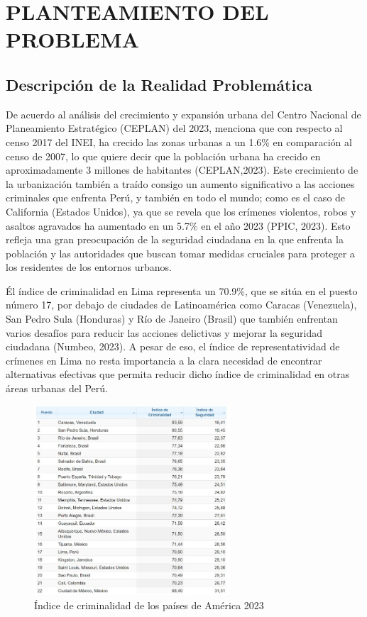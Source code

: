 \chapter{PLANTEAMIENTO DEL PROBLEMA}
\section{Descripción de la Realidad Problemática}

De acuerdo al análisis del crecimiento y expansión urbana del Centro Nacional de Planeamiento Estratégico (CEPLAN) del 2023, menciona que con respecto al censo 2017 del INEI, ha crecido las zonas urbanas a un 1.6\% en comparación al censo de 2007, lo que quiere decir que la población urbana ha crecido en aproximadamente 3 millones de habitantes (CEPLAN,2023). Este crecimiento de la urbanización también a traído consigo un aumento significativo a las acciones criminales que enfrenta Perú, y también en todo el mundo; como es el caso de California (Estados Unidos), ya que se revela que los crímenes violentos, robos y asaltos agravados ha aumentado en un 5.7\% en el año 2023 (PPIC, 2023). Esto refleja una gran preocupación de la seguridad ciudadana en la que enfrenta la población y las autoridades que buscan tomar medidas cruciales para proteger a los residentes de los entornos urbanos. 

Él índice de criminalidad en Lima representa un 70.9\%, que se sitúa en el puesto número 17, por debajo de ciudades de Latinoamérica como Caracas (Venezuela), San Pedro Sula (Honduras) y Río de Janeiro (Brasil) que también enfrentan varios desafíos para reducir las acciones delictivas y mejorar la seguridad ciudadana (Numbeo, 2023). A pesar de eso, el índice de representatividad de crímenes en Lima no resta importancia a la clara necesidad de encontrar alternativas efectivas que permita reducir dicho índice de criminalidad en otras áreas urbanas del Perú.%
\begin{figure}[h]
	\begin{center}
		\includegraphics[width=0.65\textwidth]{1/figures/fig11.jpg}
		\caption{Índice de criminalidad de los países de América 2023}
		\label{1:fig}
	\end{center}
\end{figure}

